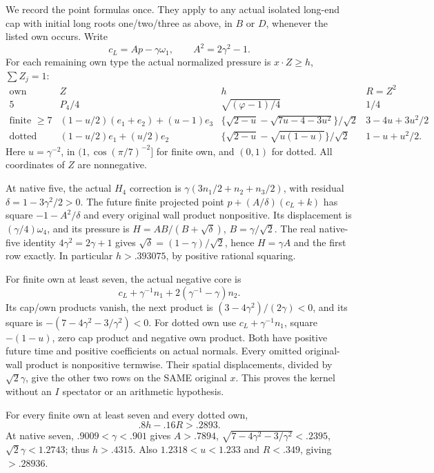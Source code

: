 We record the point formulas once.
They apply to any actual isolated
long-end cap with initial long roots
one/two/three as above, in \(B\) or
\(D\), whenever the listed own occurs.
Write
\[
                  c_L=Ap-\gamma\omega_1,\qquad A^2=2\gamma^2-1 .
\]
For each remaining own type the
actual normalized pressure is
\(x\cdot Z\ge h\), \(\sum Z_j=1\):
\[
\begin{array}{c|c|c|c}
 \text{own}&Z&h&R=Z^2\\ \hline
 5&P_4/4&\sqrt{(\varphi-1)/4}&1/4\\
 \text{finite }\ge7&
 (1-u/2)(e_1+e_2)+(u-1)e_3&
 \{\sqrt{2-u}-\sqrt{7u-4-3u^2}\}/\sqrt2&
                   3-4u+3u^2/2\\
 \text{dotted}&(1-u/2)e_1+(u/2)e_2&
 \{\sqrt{2-u}-\sqrt{u(1-u)}\}/\sqrt2&
                   1-u+u^2/2 .
\end{array}
\tag{B19headfeet}\label{app:exact19:eq:longfeet}
\]
Here \(u=\gamma^{-2}\), in
\((1,\cos(\pi/7)^{-2}]\) for finite
own, and \((0,1)\) for dotted.
All coordinates of \(Z\) are
nonnegative.

At native five, the actual \(H_4\)
correction is
\(\gamma(3n_1/2+n_2+n_3/2)\),
with residual
\(\delta=1-3\gamma^2/2>0\).
The future finite projected point
\(p+(A/\delta)(c_L+k)\) has square
\(-1-A^2/\delta\) and every original
wall product nonpositive.
Its displacement is
\((\gamma/4)\omega_4\), and its
pressure is \(H=AB/(B+\sqrt\delta)\),
\(B=\gamma/\sqrt2\).
The real native-five identity
\(4\gamma^2=2\gamma+1\) gives
\(\sqrt\delta=(1-\gamma)/\sqrt2\),
hence \(H=\gamma A\) and the first
row exactly.
In particular \(h>.393075\),
by positive rational squaring.

For finite own at least seven,
the actual negative core is
\[
 c_L+\gamma^{-1}n_1+2(\gamma^{-1}-\gamma)n_2 .
\]
Its cap/own products vanish, the
next product is
\((3-4\gamma^2)/(2\gamma)<0\),
and its square is
\(-(7-4\gamma^2-3/\gamma^2)<0\).
For dotted own use
\(c_L+\gamma^{-1}n_1\), square
\(-(1-u)\), zero cap product and
negative own product.
Both have positive future time
and positive coefficients on actual
normals.
Every omitted original-wall product
is nonpositive termwise.
Their spatial displacements, divided
by \(\sqrt2\gamma\), give the other
two rows on the SAME original \(x\).
This proves the kernel without an
\(I\) spectator or an arithmetic
hypothesis.

For every finite own at least seven
and every dotted own,
\[
                              .8h-.16R>.2893 .
\tag{longF}\label{app:exact19:eq:longF}
\]
At native seven,
\(.9009<\gamma<.901\) gives
\(A>.7894\),
\(\sqrt{7-4\gamma^2-3/\gamma^2}<.2395\),
\(\sqrt2\gamma<1.2743\);
thus \(h>.4315\).
Also \(1.2318<u<1.233\) and
\(R<.349\), giving \(>.28936\).

